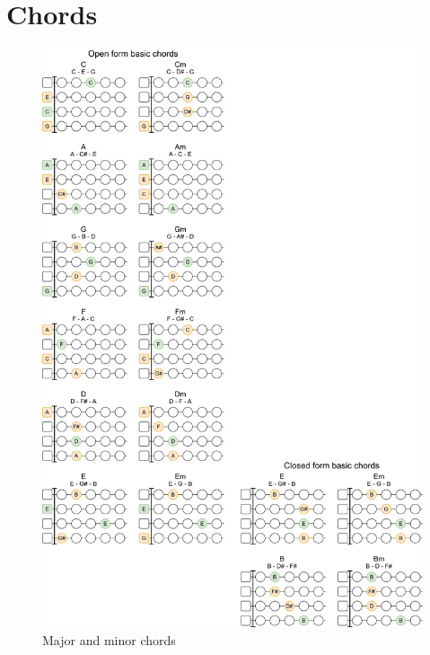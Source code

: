 \section{Chords}

\newpage

\begin{figure}[h]
	\centering
	\includegraphics[height=\textheight]{../../Images/UkuleleBasicChords.png}
	\caption{Major and minor chords}
	\label{fig:ukulele_major_minor_chords}
\end{figure}

\newpage

